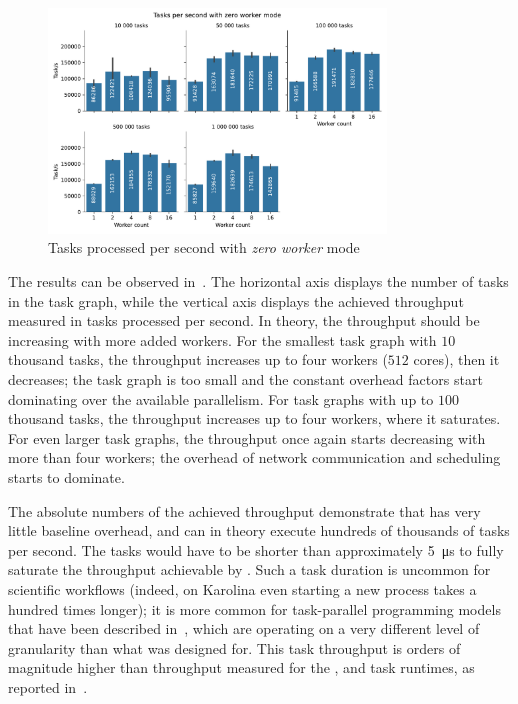 \begin{figure}[h]
	\centering
	\includegraphics[width=0.8\textwidth]{imgs/hq/charts/task-per-s}
	\caption{Tasks processed per second with \emph{zero worker} mode}
	\label{fig:hq-tasks-per-s}
\end{figure}

The results can be observed in~. The horizontal axis displays the number of
tasks in the task graph, while the vertical axis displays the achieved throughput measured in tasks
processed per second. In theory, the throughput should be increasing with more added workers. For
the smallest task graph with $10$ thousand tasks, the throughput increases up to
four workers ($512$ cores), then it decreases; the task graph is too small and the
constant overhead factors start dominating over the available parallelism. For task graphs with up
to $100$ thousand tasks, the throughput increases up to four workers, where it
saturates. For even larger task graphs, the throughput once again starts decreasing with more than
four workers; the overhead of network communication and scheduling starts to dominate.

The absolute numbers of the achieved throughput demonstrate that \hyperqueue{} has very
little baseline overhead, and can in theory execute hundreds of thousands of tasks per second. The
tasks would have to be shorter than approximately \SI{5}{\micro\second} to fully saturate the
throughput achievable by \hyperqueue{}. Such a task duration is uncommon for scientific
workflows (indeed, on Karolina even starting a new process takes a hundred times longer); it is
more common for task-parallel programming models that have been described
in~, which are operating on a very different level of granularity than what
\hyperqueue{} was designed for. This task throughput is orders of magnitude higher than
throughput measured for the \parsl{}, \fireworks{} and
\dask{} task runtimes, as reported in~\cite{parsl}.

